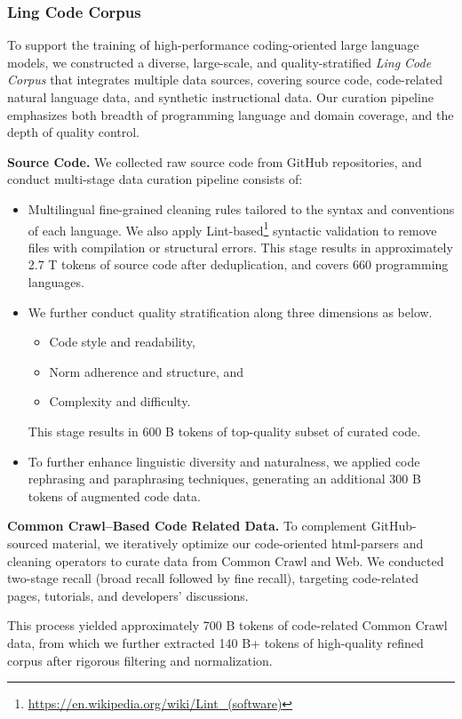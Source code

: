\documentclass[table]{gtech}
\theoremstyle{definition}
\begin{document}
\subsubsection{Ling Code Corpus}\label{appendix:coder}
To support the training of high-performance coding-oriented large language models, we constructed a diverse, large-scale, and quality-stratified \emph{Ling Code Corpus} that integrates multiple data sources, covering source code, code-related natural language data, and synthetic instructional data. 
Our curation pipeline emphasizes both breadth of programming language and domain coverage, and the depth of quality control.

{\bfseries Source Code.} We collected raw source code from GitHub repositories, and conduct multi-stage data curation pipeline consists of:
\begin{itemize}
\item Multilingual fine-grained cleaning rules tailored to the syntax and conventions of each language.
We also apply Lint-based\footnote{\url{https://en.wikipedia.org/wiki/Lint_(software)}} syntactic validation to remove files with compilation or structural errors. This stage results in approximately 2.7 T tokens of source code after deduplication, and covers 660 programming languages.
\item We further conduct quality stratification along three dimensions as below.
    \begin{itemize}
        \item Code style and readability,
        \item Norm adherence and structure, and
        \item Complexity and difficulty.
    \end{itemize}
    This stage results in 600 B tokens of top-quality subset of curated code.
\item To further enhance linguistic diversity and naturalness, we applied code rephrasing and paraphrasing techniques, generating an additional 300 B tokens of augmented code data.
\end{itemize}

{\bfseries Common Crawl–Based Code Related Data. }
To complement GitHub-sourced material, we iteratively optimize our code-oriented html-parsers and cleaning operators to curate data from Common Crawl and Web. We conducted two-stage recall (broad recall followed by fine recall), targeting code-related pages, tutorials, and developers' discussions.

This process yielded approximately 700 B tokens of code-related Common Crawl data, from which we further extracted 140 B+ tokens of high-quality refined corpus after rigorous filtering and normalization.
\end{document}
